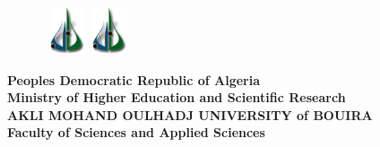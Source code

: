 \begin{titlepage}

\begin{figure}[htbp]
 \hbox{
     \includegraphics[width=40px]{logo.png}
     \hspace*{12.5cm}
     \includegraphics[width=40px]{logo.png}
  }
\end{figure}

\vspace {-1.8cm}

\begin{center}
{\bf Peoples Democratic Republic of Algeria\\
Ministry of Higher Education and Scientific Research} \vspace{0.2cm}\\

{\bf {\large AKLI MOHAND OULHADJ UNIVERSITY of BOUIRA}}\\

{\bf Faculty of Sciences and Applied Sciences} \\


\end{center}
\end{titlepage}
